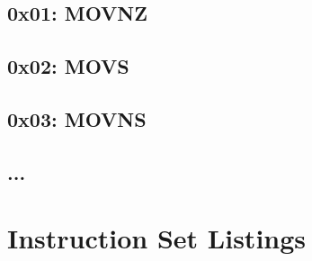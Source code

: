 \documentclass[oneside, a4paper]{memoir}
\begin{document}
\section*{0x01: MOVNZ}
\section*{0x02: MOVS}
\section*{0x03: MOVNS}
\section*{...}

\appendix
\chapter{Instruction Set Listings}
\end{document}
